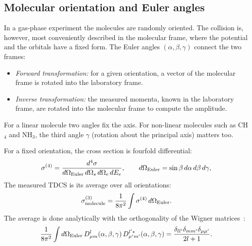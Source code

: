 \documentclass[11pt,a4paper]{article}
\newcommand{\NH}{NH$_3$}
\newcommand{\CH}{CH$_4$}
\begin{document}
\subsection{Molecular orientation and Euler angles}
In a gas-phase experiment the molecules are randomly oriented. The collision is, however, most
conveniently described in the molecular frame, where the potential and the orbitals have a
fixed form. The Euler angles $(\alpha,\beta,\gamma)$ connect the two frames:
\begin{itemize}
\item \emph{Forward transformation:} for a given orientation, a vector of the molecular frame is
  rotated into the laboratory frame.
\item \emph{Inverse transformation:} the measured momenta, known in the laboratory frame, are
  rotated into the molecular frame to compute the amplitude.
\end{itemize}
For a linear molecule two angles fix the axis. For non-linear molecules such as \CH{} and \NH,
the third angle $\gamma$ (rotation about the principal axis) matters too.

For a fixed orientation, the cross section is fourfold differential:
\begin{equation}
\sigma^{(4)}=\frac{d^4\sigma}{d\Omega_{\rm Euler}\,d\Omega_s\,d\Omega_e\,dE_e},\qquad
d\Omega_{\rm Euler}=\sin\beta\,d\alpha\,d\beta\,d\gamma ,
\end{equation}
The measured TDCS is its average over all orientations:
\begin{equation}
\sigma^{(3)}_{\rm molecule}=\frac1{8\pi^2}\int\sigma^{(4)}\,d\Omega_{\rm Euler}.
\end{equation}
The average is done analytically with the orthogonality of the Wigner matrices~\cite{Davydov1976,Champion2006}:
\begin{equation}
\frac1{8\pi^2}\int d\Omega_{\rm Euler}\,D^{l}_{\mu m}(\alpha,\beta,\gamma)\,D^{l'*}_{\mu'm'}(\alpha,\beta,\gamma)
=\frac{\delta_{ll'}\delta_{mm'}\delta_{\mu\mu'}}{2l+1}.
\label{eq:wigner}
\end{equation}
\end{document}
